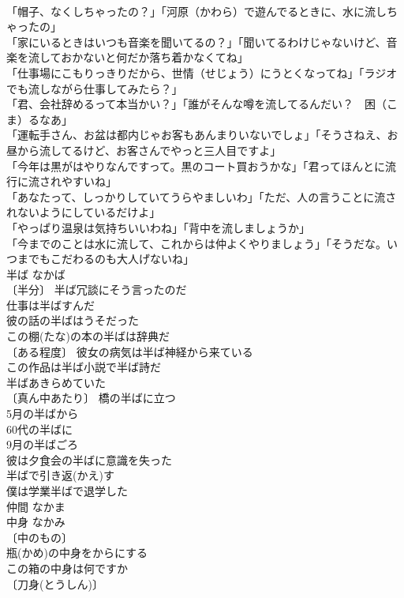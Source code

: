 \documentclass[8pt]{extreport}
\begin{document}
\begin{CJK}{UTF8}{min}
\\	「帽子、なくしちゃったの？」「河原（かわら）で遊んでるときに、水に流しちゃったの」 
\\	「家にいるときはいつも音楽を聞いてるの？」「聞いてるわけじゃないけど、音楽を流しておかないと何だか落ち着かなくてね」 
\\	「仕事場にこもりっきりだから、世情（せじょう）にうとくなってね」「ラジオでも流しながら仕事してみたら？」 
\\	「君、会社辞めるって本当かい？」「誰がそんな噂を流してるんだい？　困（こま）るなあ」 
\\	「運転手さん、お盆は都内じゃお客もあんまりいないでしょ」「そうさねえ、お昼から流してるけど、お客さんでやっと三人目ですよ」 
\\	「今年は黒がはやりなんですって。黒のコート買おうかな」「君ってほんとに流行に流されやすいね」 
\\	「あなたって、しっかりしていてうらやましいわ」「ただ、人の言うことに流されないようにしているだけよ」 
\\	「やっぱり温泉は気持ちいいわね」「背中を流しましょうか」 
\\	「今までのことは水に流して、これからは仲よくやりましょう」「そうだな。いつまでもこだわるのも大人げないね」 
\\	半ば	なかば	
\\	〔半分〕 半ば冗談にそう言ったのだ 
\\	仕事は半ばすんだ 
\\	彼の話の半ばはうそだった 
\\	この棚(たな)の本の半ばは辞典だ 
\\	〔ある程度〕 彼女の病気は半ば神経から来ている 
\\	この作品は半ば小説で半ば詩だ 
\\	半ばあきらめていた 
\\	〔真ん中あたり〕 橋の半ばに立つ 
\\	5月の半ばから 
\\	60代の半ばに 
\\	9月の半ばごろ 
\\	彼は夕食会の半ばに意識を失った 
\\	半ばで引き返(かえ)す 
\\	僕は学業半ばで退学した 
\\	仲間	なかま	
\\	中身	なかみ	
\\	〔中のもの〕
\\	瓶(かめ)の中身をからにする 
\\	この箱の中身は何ですか 
\\	〔刀身(とうしん)〕

\end{CJK}
\end{document}
